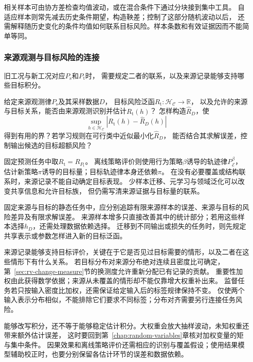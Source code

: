 相关样本可由协方差检查均值波动，或在混合条件下通过分块接到集中工具。
自适应样本则常先减去历史条件期望，构造鞅差；控制了这部分随机波动以后，
还需解释随历史变化的条件均值如何联系目标风险。样本条数和有效证据因而不能简单等同。

\subsubsection{来源观测与目标风险的连接}
\label{sec:future-analysis-source-target}

旧工况与新工况对应$P_{\mathrm s}$和$P_{\mathrm t}$时，
需要规定二者的联系，以及来源记录能够支持哪些目标积分。

\begin{mathproblem}[来源观测与目标风险的连接]
  \label{question:future-source-target}
  给定来源观测律$P_{\mathrm s}$及其采样数据$D$，
  目标风险泛函$R_{\mathrm t}:\mathcal H_{\mathcal C}\to\mathbb R$，
  以及允许的来源与目标关系，能否由来源观测识别并估计$R_{\mathrm t}(h)$？
  怎样构造$\widehat R_D$，使
  \[
    \sup_{h\in\mathcal H_{\mathcal C}}
      |R_{\mathrm t}(h)-\widehat R_D(h)|
  \]
  得到有用的界？若学习规则在可行类中近似最小化$\widehat R_D$，
  能否结合其求解误差，控制输出候选的目标超额风险？
\end{mathproblem}

固定预测任务中取$R_{\mathrm t}=R_{P_{\mathrm t}}$。
离线策略评价则使用行为策略$\beta$诱导的轨迹律$P_{\mathcal E}^{\beta}$，
估计新策略$\pi$诱导的目标量；目标轨迹律本身还依赖$\pi$。
在没有必要覆盖或结构联系时，来源记录不能自动确定目标表现。
少样本迁移、元学习与领域泛化可以改变共享信息和允许目标族，
但仍需写清来源证据与目标量的联系。

固定来源与目标的静态任务中，应分别追踪有限来源样本的误差、来源与目标的风险差异及有限求解误差。
来源样本增多只直接改善其中的统计部分；若用这些样本选择$h_D$，还需处理数据依赖选择。
迁移到不同输出或损失的任务时，则先规定共享表示或参数怎样进入新的目标泛函。

来源记录能够支持目标评价，关键在于它是否见过目标需要的情形，以及二者在这些情形下有什么关系。
若目标分布对来源分布绝对连续且密度比可确定，第~\ref{sec:rv-change-measure}节的换测度允许重新分配已有记录的贡献。
重要性加权由此获得数学依据；来源从未覆盖的情形却不能仅靠增大权重补出来。
监督任务若只按输入密度比加权，还需保证给定输入后的标签规律保持不变。
仅使两个输入表示分布相似，不能排除它们要求不同标签；分布对齐需要另行连接任务风险。

能够改写积分，还不等于能够稳定估计积分。大权重会放大抽样波动，未知权重还带来额外估计误差，
这时要回到第~\ref{chap:random-variables}章核对加权变量的矩与集中条件。
因果效果和离线策略评价还需相应的识别与覆盖假设；使用结果模型辅助校正时，也要分别保留各估计环节的误差和数据依赖。

